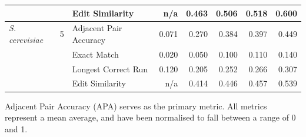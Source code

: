 \begin{table}[!tb]
\begin{tabular}{lrlrrrrr}
     &  & Edit Similarity & n/a & 0.463 & 0.506 & 0.518 & 0.600 \\
    \midrule
    \textit{S. cerevisiae} & 5 & Adjacent Pair Accuracy & 0.071 & 0.270 & 0.384 & 0.397 & 0.449 \\
     &  & Exact Match & 0.020 & 0.050 & 0.100 & 0.110 & 0.140 \\
     &  & Longest Correct Run & 0.120 & 0.205 & 0.252 & 0.266 & 0.307 \\
     &  & Edit Similarity & n/a & 0.414 & 0.446 & 0.457 & 0.539 \\
    \bottomrule
  \end{tabular}
  \par\smallskip\footnotesize{Adjacent Pair Accuracy (APA) serves as the primary metric. All metrics represent a mean average, and have been normalised to fall between a range of 0 and 1.}
\end{table}
